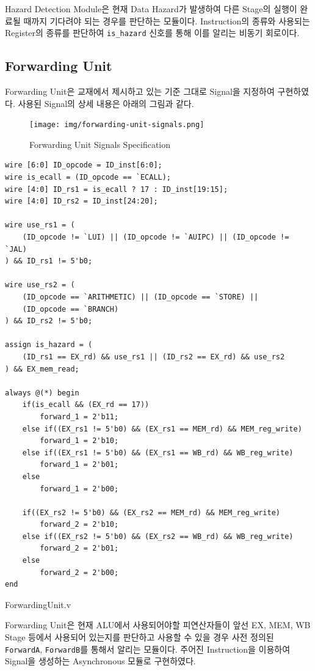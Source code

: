 \documentclass[openright, a4paper]{article}
\newcommand{\code}[1]{\texttt{#1}}
\newenvironment{longlisting}{\captionsetup{type=listing}}{}
\begin{document}
Hazard Detection Module은 현재 Data Hazard가 발생하여 다른 Stage의 실행이 완료될 때까지 기다려야 되는 경우를 판단하는 모듈이다. Instruction의 종류와 사용되는 Register의 종류를 판단하여 \code{is_hazard} 신호를 통해 이를 알리는 비동기 회로이다.

\subsection{Forwarding Unit}

Forwarding Unit은 교재에서 제시하고 있는 기준 그대로 Signal을 지정하여 구현하였다. 사용된 Signal의 상세 내용은 아래의 그림과 같다.

\begin{figure}[!h]
    \centering
    \texttt{[image: img/forwarding-unit-signals.png]}
    \caption{Forwarding Unit Signals Specification}
\end{figure}

\begin{longlisting}
    \begin{verbatim}
wire [6:0] ID_opcode = ID_inst[6:0];
wire is_ecall = (ID_opcode == `ECALL);
wire [4:0] ID_rs1 = is_ecall ? 17 : ID_inst[19:15];
wire [4:0] ID_rs2 = ID_inst[24:20];

wire use_rs1 = (
    (ID_opcode != `LUI) || (ID_opcode != `AUIPC) || (ID_opcode != `JAL)
) && ID_rs1 != 5'b0; 

wire use_rs2 = (
    (ID_opcode == `ARITHMETIC) || (ID_opcode == `STORE) ||
    (ID_opcode == `BRANCH)
) && ID_rs2 != 5'b0;

assign is_hazard = (
    (ID_rs1 == EX_rd) && use_rs1 || (ID_rs2 == EX_rd) && use_rs2 
) && EX_mem_read;

always @(*) begin
    if(is_ecall && (EX_rd == 17))
        forward_1 = 2'b11;
    else if((EX_rs1 != 5'b0) && (EX_rs1 == MEM_rd) && MEM_reg_write)
        forward_1 = 2'b10;
    else if((EX_rs1 != 5'b0) && (EX_rs1 == WB_rd) && WB_reg_write)
        forward_1 = 2'b01;
    else
        forward_1 = 2'b00;

    if((EX_rs2 != 5'b0) && (EX_rs2 == MEM_rd) && MEM_reg_write)
        forward_2 = 2'b10;
    else if((EX_rs2 != 5'b0) && (EX_rs2 == WB_rd) && WB_reg_write)
        forward_2 = 2'b01;
    else
        forward_2 = 2'b00;
end
    \end{verbatim}
    \caption{ForwardingUnit.v}
\end{longlisting}

Forwarding Unit은 현재 ALU에서 사용되어야할 피연산자들이 앞선 EX, MEM, WB Stage 등에서 사용되어 있는지를 판단하고 사용할 수 있을 경우 사전 정의된 \code{ForwardA}, \code{ForwardB}를 통해서 알리는 모듈이다. 주어진 Instruction을 이용하여 Signal을 생성하는 Asynchronous 모듈로 구현하였다. \\
\end{document}

